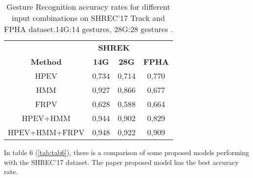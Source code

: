 \documentclass[12pt]{book}
\begin{document}
\begin{table}[!htbp]
\centering
\begin{tabular}{|c|c|c|c|}
\hline
{ }                                  & \multicolumn{2}{c|}{{ \textbf{SHREK}}}                & { }                                \\ \cline{2-3}
\multirow{-2}{*}{{ \textbf{Method}}} & { \textbf{14G}} & { \textbf{28G}} & \multirow{-2}{*}{{ \textbf{FPHA}}} \\ \hline
{HPEV}                     & { 0,734}        & { 0,714}        & { 0,770}                           \\ \hline
{HMM}                      & { 0,927}        & { 0,866}        & { 0,677}                           \\ \hline
FRPV                                                     & 0,628                               & 0,588                               & 0,664                                                  \\ \hline
HPEV+HMM                                                 & 0,944                               & 0,902                               & 0,829                                                  \\ \hline
HPEV+HMM+FRPV                                            & 0,948                               & 0,922                               & 0,909                                                  \\ \hline
\end{tabular}
\caption{Gesture Recognition accuracy rates for different input combinations on SHREC’17 Track and FPHA dataset.14G:14 gestures, 28G:28 gestures \cite{LIU2020}.}
\label{tab:tab5}
\end{table}

In table 6 (\ref{tab:tab6}), there is a comparison of some proposed models performing with the SHREC’17 dataset. The paper \cite{LIU2020} proposed model has the best accuracy rate.
\end{document}
